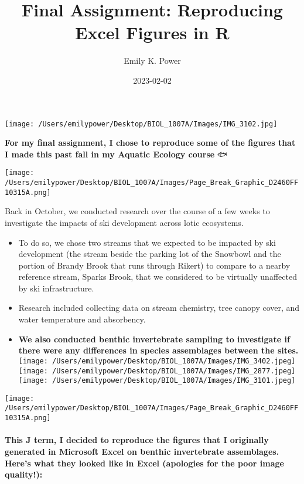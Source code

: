 \documentclass[
]{article}
\title{Final Assignment: Reproducing Excel Figures in R}
\author{Emily K. Power}
\date{2023-02-02}
\begin{document}
\maketitle

\texttt{[image: /Users/emilypower/Desktop/BIOL\_1007A/Images/IMG\_3102.jpg]}

\textbf{For my final assignment, I chose to reproduce some of the
figures that I made this past fall in my Aquatic Ecology course} 🐟🌿

\texttt{[image: /Users/emilypower/Desktop/BIOL\_1007A/Images/Page\_Break\_Graphic\_D2460FF10315A.png]}

Back in October, we conducted research over the course of a few weeks to
investigate the impacts of ski development across lotic ecosystems.

\begin{itemize}
\item
  To do so, we chose two streams that we expected to be impacted by ski
  development (the stream beside the parking lot of the Snowbowl and the
  portion of Brandy Brook that runs through Rikert) to compare to a
  nearby reference stream, Sparks Brook, that we considered to be
  virtually unaffected by ski infrastructure.
\item
  Research included collecting data on stream chemistry, tree canopy
  cover, and water temperature and absorbency.
\item
  \textbf{We also conducted benthic invertebrate sampling to investigate
  if there were any differences in species assemblages between the
  sites.}\\
  \texttt{[image: /Users/emilypower/Desktop/BIOL\_1007A/Images/IMG\_3402.jpeg]}
  \texttt{[image: /Users/emilypower/Desktop/BIOL\_1007A/Images/IMG\_2877.jpeg]}
  \texttt{[image: /Users/emilypower/Desktop/BIOL\_1007A/Images/IMG\_3101.jpeg]}
\end{itemize}

\texttt{[image: /Users/emilypower/Desktop/BIOL\_1007A/Images/Page\_Break\_Graphic\_D2460FF10315A.png]}

\hypertarget{this-j-term-i-decided-to-reproduce-the-figures-that-i-originally-generated-in-microsoft-excel-on-benthic-invertebrate-assemblages.-heres-what-they-looked-like-in-excel-apologies-for-the-poor-image-quality}{%
\paragraph{This J term, I decided to reproduce the figures that I
originally generated in Microsoft Excel on benthic invertebrate
assemblages. Here's what they looked like in Excel (apologies for the
poor image
quality!):}\label{this-j-term-i-decided-to-reproduce-the-figures-that-i-originally-generated-in-microsoft-excel-on-benthic-invertebrate-assemblages.-heres-what-they-looked-like-in-excel-apologies-for-the-poor-image-quality}}
\end{document}
